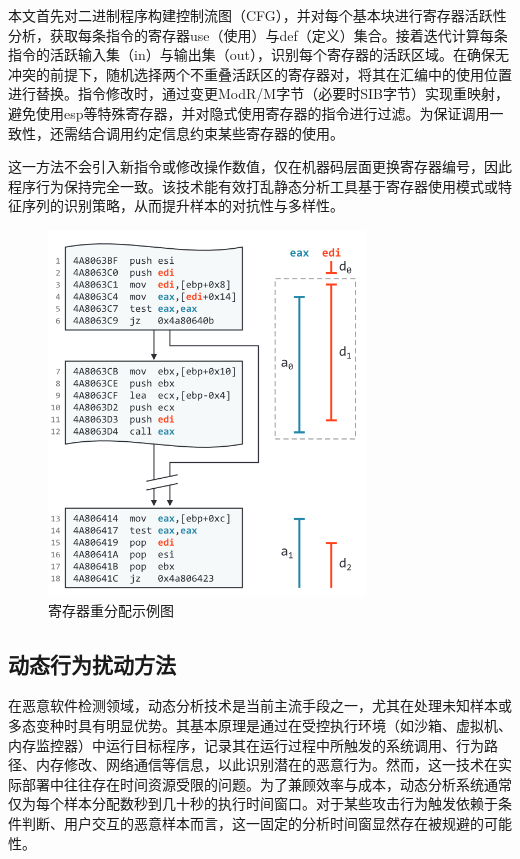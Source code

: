 本文首先对二进制程序构建控制流图（CFG），并对每个基本块进行寄存器活跃性分析，获取每条指令的寄存器use（使用）与def（定义）集合。接着迭代计算每条指令的活跃输入集（in）与输出集（out），识别每个寄存器的活跃区域。在确保无冲突的前提下，随机选择两个不重叠活跃区的寄存器对，将其在汇编中的使用位置进行替换。指令修改时，通过变更ModR/M字节（必要时SIB字节）实现重映射，避免使用esp等特殊寄存器，并对隐式使用寄存器的指令进行过滤。为保证调用一致性，还需结合调用约定信息约束某些寄存器的使用。

这一方法不会引入新指令或修改操作数值，仅在机器码层面更换寄存器编号，因此程序行为保持完全一致。该技术能有效打乱静态分析工具基于寄存器使用模式或特征序列的识别策略，从而提升样本的对抗性与多样性。

\begin{figure}[hbt]
	\centering
	\includegraphics[width=0.75\textwidth]{figures/4.6}
	\caption{寄存器重分配示例图}\label{fig:4.6}
\end{figure}

\subsection{动态行为扰动方法}

在恶意软件检测领域，动态分析技术是当前主流手段之一，尤其在处理未知样本或多态变种时具有明显优势。其基本原理是通过在受控执行环境（如沙箱、虚拟机、内存监控器）中运行目标程序，记录其在运行过程中所触发的系统调用、行为路径、内存修改、网络通信等信息，以此识别潜在的恶意行为。然而，这一技术在实际部署中往往存在时间资源受限的问题。为了兼顾效率与成本，动态分析系统通常仅为每个样本分配数秒到几十秒的执行时间窗口。对于某些攻击行为触发依赖于条件判断、用户交互的恶意样本而言，这一固定的分析时间窗显然存在被规避的可能性。

